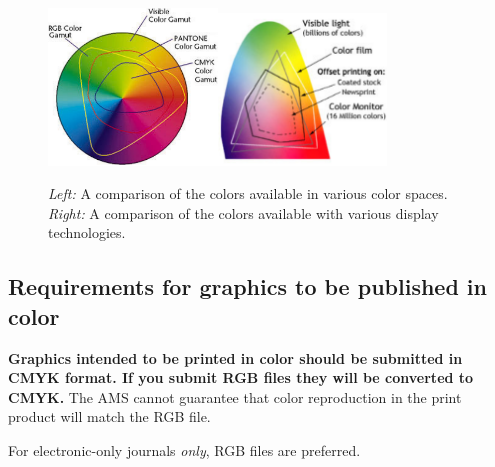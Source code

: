 \begin{figure}
\noindent\includegraphics[width=0.4\textwidth]{gamuts}\qquad\includegraphics[width=0.4\textwidth]{spectrum}
\caption{\emph{Left:} A comparison of the colors available in various color
  spaces. \emph{Right:} A comparison of the colors available with various
  display technologies.}\label{fig:gamuts}
\end{figure}


\subsection{Requirements for graphics to be published in color}

\textbf{Graphics intended to be printed in color should be submitted in
 CMYK format. If you submit RGB files they will be converted to CMYK\@.}
 The AMS cannot guarantee that color reproduction in the print product will
 match the RGB file.

\ifjournal
 For electronic-only journals \emph{only}, RGB files are preferred.
\fi

